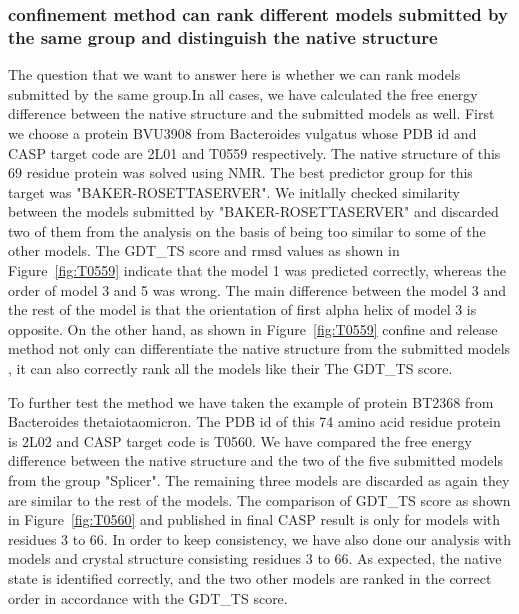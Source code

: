 \documentclass[12pt]{article}
\begin{document}
\subsubsection{confinement method can rank different models submitted by the same group and distinguish the native structure}

The question that we want to answer here is whether we can rank models submitted by the same group.In all cases, we have calculated the free energy
difference between the native structure and the submitted models as well. 
First we choose a protein BVU3908 from Bacteroides vulgatus whose PDB id and CASP target code are
2L01 and T0559 respectively. The native structure of this 69 residue protein was solved using NMR.
The best predictor group for this target was "BAKER-ROSETTASERVER".
We initlally checked similarity between the models submitted by "BAKER-ROSETTASERVER" and discarded two of them from the 
analysis on the basis of being too similar to some of the other models. The GDT\_TS score and rmsd
values as shown in Figure~\ref{fig:T0559} indicate that the model 1 was predicted correctly, 
whereas the order of model 3 and 5 was wrong. The main difference
between the model 3 and the rest of the model is that the orientation of first alpha helix of model 3 is opposite.
On the other hand, as shown in Figure~\ref{fig:T0559} confine and release method not only can differentiate the native 
structure from the submitted models , it can also correctly rank all the models like their The GDT\_TS score.  

To further test the method we have taken the example of protein BT2368 from Bacteroides thetaiotaomicron. The PDB id of this 
74 amino acid residue protein is 2L02 and CASP target code is T0560. We have compared the free energy difference between 
the native structure and the two of the five submitted models from the group "Splicer". The remaining three models are discarded as 
again they are similar to the rest of the models. The comparison of GDT\_TS score as shown in 
Figure~\ref{fig:T0560} and published in final CASP result is only for models with residues 3 to 66. In order to keep
consistency, we have also done our analysis with models and crystal structure consisting residues 3 to 66. As expected,
the native state is identified correctly, and the two other models are ranked in the correct order in accordance with the GDT\_TS score.   
\end{document}

